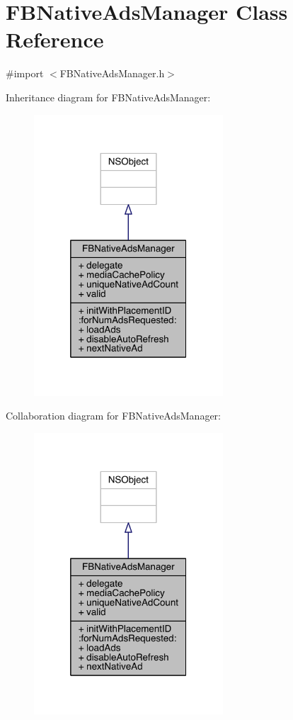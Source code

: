 \hypertarget{interface_f_b_native_ads_manager}{\section{F\-B\-Native\-Ads\-Manager Class Reference}
\label{interface_f_b_native_ads_manager}
}


{\ttfamily \#import $<$F\-B\-Native\-Ads\-Manager.\-h$>$}



Inheritance diagram for F\-B\-Native\-Ads\-Manager\-:
\nopagebreak
\begin{figure}[H]
\begin{center}
\leavevmode
\includegraphics[width=200pt]{interface_f_b_native_ads_manager__inherit__graph}
\end{center}
\end{figure}


Collaboration diagram for F\-B\-Native\-Ads\-Manager\-:
\nopagebreak
\begin{figure}[H]
\begin{center}
\leavevmode
\includegraphics[width=200pt]{interface_f_b_native_ads_manager__coll__graph}
\end{center}
\end{figure}

